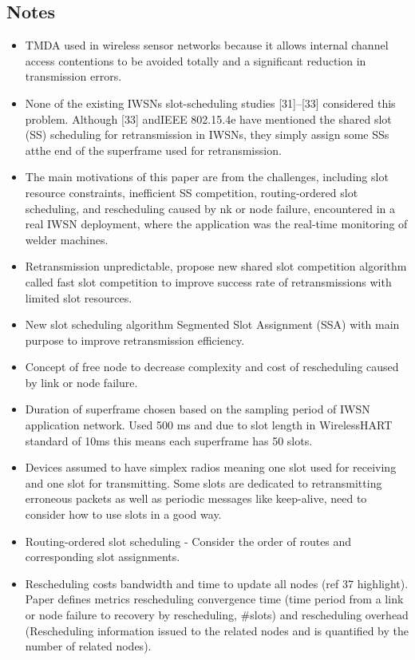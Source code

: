 \documentclass{article}
\begin{document}
\subsection{Notes}
\begin{itemize}
    \item TMDA used in wireless sensor networks because it allows internal channel access contentions to be avoided totally and a significant reduction in transmission errors.
    \item None of the existing IWSNs slot-scheduling studies [31]–[33] considered this problem. Although [33] andIEEE 802.15.4e have mentioned the shared slot (SS) scheduling for retransmission in IWSNs, they simply assign some SSs atthe end of the superframe used for retransmission.
    \item The main motivations of this paper are from the challenges, including slot resource constraints, inefficient SS competition, routing-ordered slot scheduling, and rescheduling caused by nk or node failure, encountered in a real IWSN deployment, where the application was the real-time monitoring of welder machines.
    \item Retransmission unpredictable, propose new shared slot competition algorithm called fast slot competition to improve success rate of retransmissions with limited slot resources.
    \item New slot scheduling algorithm Segmented Slot Assignment (SSA) with main purpose to improve retransmission efficiency.
    \item Concept of free node to decrease complexity and cost of rescheduling caused by link or node failure.
    \item Duration of superframe chosen based on the sampling period of IWSN application network.  Used 500 ms and due to slot length in WirelessHART standard of 10ms this means each superframe has 50 slots.
    \item Devices assumed to have simplex radios meaning one slot used for receiving and one slot for transmitting.  Some slots are dedicated to retransmitting erroneous packets as well as periodic messages like keep-alive, need to consider how to use slots in a good way.
    \item Routing-ordered slot scheduling - Consider the order of routes and corresponding slot assignments.
    \item Rescheduling costs bandwidth and time to update all nodes (ref 37 highlight).  Paper defines metrics rescheduling convergence time (time period from a link or node failure to recovery by rescheduling, \#slots) and rescheduling overhead (Rescheduling information issued to the related nodes and is quantified by the number of related nodes).

\end{itemize}
\end{document}
